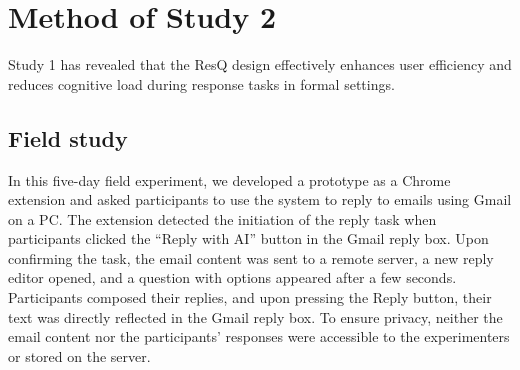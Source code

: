 \section{Method of Study 2}
Study 1 has revealed that the ResQ design effectively enhances user efficiency and reduces cognitive load during response tasks in formal settings.
\subsection{Field study}

In this five-day field experiment, we developed a prototype as a Chrome extension and asked participants to use the system to reply to emails using Gmail on a PC.
The extension detected the initiation of the reply task when participants clicked the ``Reply with AI'' button in the Gmail reply box. 
Upon confirming the task, the email content was sent to a remote server, a new reply editor opened, and a question with options appeared after a few seconds. 
Participants composed their replies, and upon pressing the Reply button, their text was directly reflected in the Gmail reply box. 
To ensure privacy, neither the email content nor the participants' responses were accessible to the experimenters or stored on the server.

